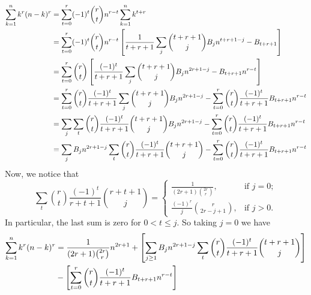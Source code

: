 \begin{equation}
    \begin{split}
        \sum_{k=1}^{n} k^{r} (n-k)^{r}
        &= \sum_{t=0}^{r} (-1)^t \binom{r}{t} n^{r-t} \sum_{k=1}^{n} k^{t+r} \\
        &= \sum_{t=0}^{r} (-1)^t \binom{r}{t} n^{r-t} \left[ \frac{1}{t+r+1} \sum_{j} \binom{t+r+1}{j} {B}\sb{j} n^{t+r+1-j} - {B}\sb{t+r+1} \right] \\
        &= \sum_{t=0}^{r} \binom{r}{t} \left[ \frac{(-1)^t}{t+r+1} \sum_{j} \binom{t+r+1}{j} {B}\sb{j} n^{2r+1-j} - {B}\sb{t+r+1} n^{r-t} \right] \\
        &= \sum_{t=0}^{r} \binom{r}{t} \frac{(-1)^t}{t+r+1} \sum_{j} \binom{t+r+1}{j} {B}\sb{j} n^{2r+1-j} - \sum_{t=0}^{r} \binom{r}{t} \frac{(-1)^t}{t+r+1} {B}\sb{t+r+1} n^{r-t} \\
        &= \sum_{j} \sum_{t} \binom{r}{t} \frac{(-1)^t}{t+r+1} \binom{t+r+1}{j} {B}\sb{j} n^{2r+1-j} - \sum_{t=0}^{r} \binom{r}{t} \frac{(-1)^t}{t+r+1} {B}\sb{t+r+1} n^{r-t} \\
        &= \sum_{j} {B}\sb{j} n^{2r+1-j} \sum_{t} \binom{r}{t} \frac{(-1)^t}{t+r+1} \binom{t+r+1}{j} - \sum_{t=0}^{r} \binom{r}{t} \frac{(-1)^t}{t+r+1} {B}\sb{t+r+1} n^{r-t}
    \end{split}\label{eq:equation4}
\end{equation}
Now, we notice that
\begin{equation}
    \sum_{t} \binom{r}{t} \frac{(-1)^t}{r+t+1} \binom{r+t+1}{j}
    =\begin{cases}
         \frac{1}{(2r+1) \binom{2r}r}, & \text{if } j=0;\\
         \frac{(-1)^r}{j} \binom{r}{2r-j+1}, & \text{if } j>0.
    \end{cases}\label{eq:combinatorial-identity}
\end{equation}
In particular, the last sum is zero for $0< t \leq j$.
So taking $j=0$ we have
\begin{equation}
    \begin{split}
        \sum_{k=1}^{n} k^{r} (n-k)^{r}
        &= \frac{1}{(2r+1) \binom{2r}r} n^{2r+1} + \left[ \sum_{j \geq 1} {B}\sb{j} n^{2r+1-j} \sum_{t} \binom{r}{t} \frac{(-1)^t}{t+r+1} \binom{t+r+1}{j} \right] \\
        &- \left[ \sum_{t=0}^{r} \binom{r}{t} \frac{(-1)^t}{t+r+1} {B}\sb{t+r+1} n^{r-t} \right]
    \end{split}\label{eq:equation5}
\end{equation}
